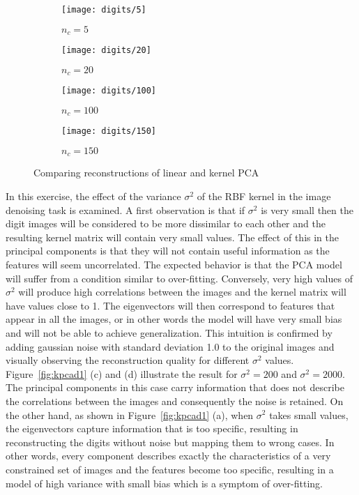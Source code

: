 \documentclass[conference,compsoc]{IEEEtran}
\begin{document}
\begin{figure*}[]
        \begin{subfigure}{0.45\linewidth}
            \texttt{[image: digits/5]}
                  \caption{$n_c=5$}
        \end{subfigure}
                \begin{subfigure}{0.45\linewidth}
            \texttt{[image: digits/20]}
                \caption{$n_c=20$}
        \end{subfigure}
                \centering
        \begin{subfigure}{0.45\linewidth}
            \texttt{[image: digits/100]}
        \caption{$n_c=100$}
        \end{subfigure}
           \begin{subfigure}{0.45\linewidth}
            \texttt{[image: digits/150]}
          \caption{$n_c=150$}
        \end{subfigure}
     
                  
\caption{Comparing reconstructions of linear and kernel PCA}        
        
             
        \label{fig:digits1}
    \end{figure*}

In this exercise, the effect of the variance $\sigma^2$ of the RBF kernel in the image denoising task is examined. A first observation is that if $\sigma^2$ is very small then the digit images will be considered to be more dissimilar to each other and the resulting kernel matrix will contain very small values. The effect of this in the principal components is that they will not contain useful information as the features will seem uncorrelated. The expected behavior is that the PCA model will suffer from a condition similar to over-fitting. Conversely, very high values of $\sigma^2$ will produce high correlations between the images and the kernel matrix will have values close to 1. The eigenvectors will then correspond to features that appear in all the images, or in other words the model will have very small bias and will not be able to achieve generalization. This intuition is confirmed by adding gaussian noise with standard deviation 1.0 to the original images and visually observing the reconstruction quality for different $\sigma^2$ values. Figure~\ref{fig:kpcad1} (c) and (d) illustrate the result for
$\sigma^2 =200$ and $\sigma^2=2000$. The principal components in this case carry information that does not describe the correlations between the images and consequently the noise is retained. On the other hand, as shown in Figure~\ref{fig:kpcad1} (a), when $\sigma^2$ takes small values, the eigenvectors capture information that is too specific, resulting in reconstructing the digits without noise but mapping them to wrong cases. In other words, every component describes exactly the characteristics of a very constrained set of images and the features become too specific, resulting in a model of high variance with small bias which is a symptom of over-fitting. 
\end{document}
